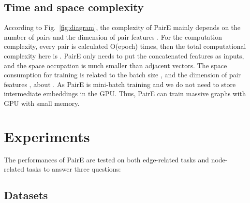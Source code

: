 \documentclass[10pt,journal,compsoc]{IEEEtran}
\begin{document}
\subsection{Time and space complexity}
According to Fig.~\ref{fig:diagram}, the complexity of PairE mainly depends on the number of pairs  and the dimension of pair features . For the computation complexity, every pair is calculated O(epoch) times, then the total computational complexity here is .
PairE only needs to put the concatenated features as inputs, and the space occupation is much smaller than adjacent vectors.  The space consumption for training is related to the batch size , and the dimension of pair features , about . As PairE is mini-batch training and we do not need to store intermediate embeddings in the GPU. Thus, PairE can train massive graphs with GPU with small memory.



















\section{Experiments}
\label{sec:experiment}

The performances of PairE are tested on both edge-related tasks and node-related tasks to answer three questions: 





\subsection{Datasets}
\label{sec:setup}
\end{document}
